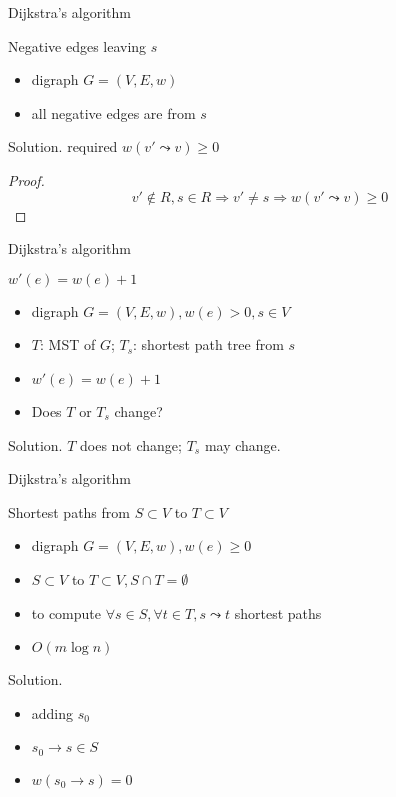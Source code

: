 \begin{frame}{Dijkstra's algorithm}
  \begin{exampleblock}{Negative edges leaving $s$ }
    \begin{itemize}
      \item digraph $G = (V, E, w)$
      \item all negative edges are from $s$
    \end{itemize}
  \end{exampleblock}

  \begin{block}{Solution.}
     required $w(v' \leadsto v) \ge 0$ 
     \begin{proof}
       \[ v' \notin R, s \in R \Rightarrow v' \neq s \Rightarrow w(v' \leadsto v) \ge 0 \]
     \end{proof}
  \end{block}
\end{frame}
\begin{frame}{Dijkstra's algorithm}
  \begin{exampleblock}{$w'(e) = w(e) + 1$ }
    \begin{itemize}
      \item digraph $G = (V, E, w), w(e) > 0, s \in V$
      \item $T$: MST of $G$; $T_{s}$: shortest path tree from $s$
      \item $w'(e) = w(e) + 1$
      \item Does $T$ or $T_{s}$ change?
    \end{itemize}
  \end{exampleblock}

  \begin{block}{Solution.}
    $T$ does not change; $T_{s}$ may change.
  \end{block}
\end{frame}
\begin{frame}{Dijkstra's algorithm}
  \begin{exampleblock}{Shortest paths from $S \subset V$ to $T \subset V$}
    \begin{itemize}
      \item digraph $G = (V, E, w), w(e) \ge 0$
      \item $S \subset V$ to $T \subset V, S \cap T = \emptyset$
      \item to compute $\forall s \in S, \forall t \in T, s \leadsto t$ shortest paths
      \item $O(m \log n)$
    \end{itemize}
  \end{exampleblock}

  \begin{block}{Solution.}
    \begin{itemize}
      \item adding $s_{0}$
      \item $s_{0} \to s \in S$
      \item $w(s_{0} \to s) = 0$
    \end{itemize}
  \end{block}
\end{frame}
